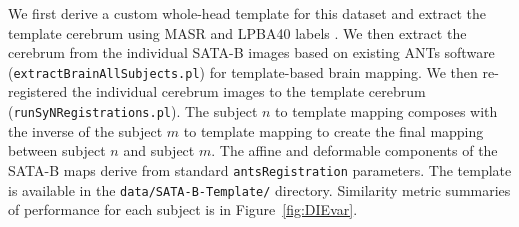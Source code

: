 \documentclass{llncs}
\begin{document}
We first derive a custom whole-head template for this dataset and
extract the template cerebrum using MASR and LPBA40 labels \cite{Shattuck2008}.
We then extract the cerebrum from the individual SATA-B images based
on existing ANTs software (\texttt{extractBrainAllSubjects.pl}) for
template-based brain mapping.  We then re-registered the individual
cerebrum images to the template cerebrum
(\texttt{runSyNRegistrations.pl}).  The subject $n$ to template
mapping composes with the inverse of the subject $m$ to template
mapping to create the final mapping between subject $n$ and subject $m$.
The affine and deformable components of the SATA-B maps derive from
standard \texttt{antsRegistration} parameters.  The template is
available in the \texttt{data/SATA-B-Template/} directory.  Similarity
metric summaries of performance for each subject is in Figure~\ref{fig:DIEvar}.
 
\end{document}
